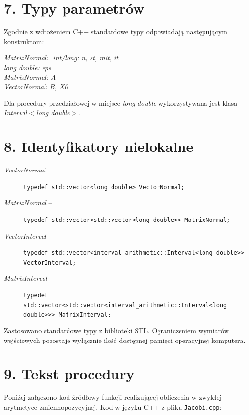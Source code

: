\documentclass[11pt,a4paper]{article}
\begin{document}
\section*{7. Typy parametrów}
Zgodnie z wdrożeniem C++ standardowe typy odpowiadają następującym konstruktom:
\begin{tabbing}
    \textit{MatrixNormal:} \quad \= \kill
    \textit{int/long:} \> \textit{n, st, mit, it} \\
    \textit{long double:} \> \textit{eps} \\
    \textit{MatrixNormal:} \> \textit{A} \\
    \textit{VectorNormal:} \> \textit{B, X0}
\end{tabbing}
Dla procedury przedziałowej w miejsce \textit{long double} wykorzystywana jest klasa \textit{Interval$<$long double$>$}.

\section*{8. Identyfikatory nielokalne}
\begin{description}
    \item[\textit{VectorNormal} --] \texttt{typedef std::vector<long double> VectorNormal;}
    \item[\textit{MatrixNormal} --] \texttt{typedef std::vector<std::vector<long double>> MatrixNormal;}
    \item[\textit{VectorInterval} --] \texttt{typedef std::vector<interval\_arithmetic::Interval<long double>> VectorInterval;}
    \item[\textit{MatrixInterval} --] \texttt{typedef std::vector<std::vector<interval\_arithmetic::Interval<long double>>> MatrixInterval;}
\end{description}
Zastosowano standardowe typy z biblioteki STL. Ograniczeniem wymiarów wejściowych pozostaje wyłącznie ilość dostępnej pamięci operacyjnej komputera.

\section*{9. Tekst procedury}
Poniżej załączono kod źródłowy funkcji realizującej obliczenia w zwykłej arytmetyce zmiennopozycyjnej. Kod w języku C++ z pliku \texttt{Jacobi.cpp}:
\end{document}
